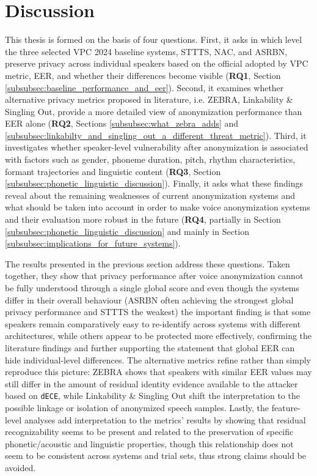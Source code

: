 \documentclass[12pt,leqno,a4paper]{article}
\begin{document}
\section{Discussion}
\label{sec:discussion}
This thesis is formed on the basis of four questions. First, it asks in which level the three selected VPC 2024 baseline systems, 
STTTS, NAC, and ASRBN, preserve privacy across individual speakers based on the official adopted by VPC metric, EER, and whether their 
differences become visible (\textbf{RQ1}, Section \ref{subsubsec:baseline_performance_and_eer}). Second, it examines whether alternative privacy metrics proposed in literature, 
i.e. ZEBRA, Linkability \& Singling Out, provide a more detailed view of anonymization performance than EER alone (\textbf{RQ2}, Sections \ref{subsubsec:what_zebra_adds} and \ref{subsubsec:linkabilty_and_singling_out_a_different_threat_metric}). 
Third, it investigates whether speaker-level vulnerability after anonymization is associated with factors such as gender, 
phoneme duration, pitch, rhythm characteristics, formant trajectories and linguistic content (\textbf{RQ3}, Section \ref{subsubsec:phonetic_linguistic_discussion}). 
Finally, it asks what these findings reveal about the remaining weaknesses of current anonymization systems and what should be taken into 
account in order to make voice anonymization systems and their evaluation more robust in the future (\textbf{RQ4}, partially in Section \ref{subsubsec:phonetic_linguistic_discussion} and mainly in Section \ref{subsubsec:implications_for_future_systems}).

The results presented in the previous section address these questions. 
Taken together, they show that privacy performance after voice anonymization cannot be fully understood through a single global score 
and even though the systems differ in their overall behaviour (ASRBN often achieving the strongest global privacy performance and STTTS the weakest) 
the important finding is that some speakers remain comparatively easy to re-identify across systems with different architectures,
while others appear to be protected more effectively, confirming the literature findings \citep{williams_anonymizing_2024,gaznepoglu2025sayexploitinglinguisticcontent} 
and further supporting the statement that global EER can hide individual-level differences. 
The alternative metrics refine rather than simply reproduce this picture: ZEBRA shows that speakers with similar EER values may still differ in the amount of residual identity evidence available to the attacker 
based on \texttt{dECE}, while Linkability \& Singling Out shift the interpretation to the possible linkage or isolation of anonymized speech samples. 
Lastly, the feature-level analyses add interpretation to the metrics' results by showing that residual recognizability
seems to be present and related to the preservation of specific phonetic/acoustic and linguistic properties, though this relationship does not seem to be consistent
across systems and trial sets, thus strong claims should be avoided.  
\end{document}
